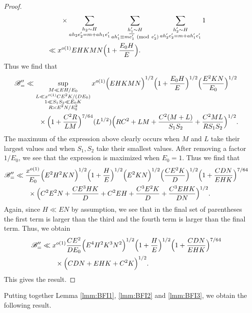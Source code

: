 \documentclass[10pt]{amsart}
\theoremstyle{plain}
\numberwithin{equation}{section}
\newcommand{\Mod}[1]{\ (\mathrm{mod}\ #1)}
\begin{document}
\begin{proof}
\begin{align*}
&\qquad\times\sum_{\substack{h_2\sim H\\ ah_2e_2'=m+ah_1e_1'}}\sum_{\substack{h_1'\sim H\\ a h_1'\equiv m\overline{e_1'}\Mod{e_2'}}}\sum_{\substack{h_2'\sim H\\ ah_2'e_2'=m+ah_1'e_1'}}1\\
&\ll x^{o(1)} E H K M N\Bigl(1+\frac{E_0 H}{E}\Bigr).
\end{align*}
Thus we find that
\begin{align*}
\mathscr{B}_{=}''&\ll \sup_{\substack{M\ll E H/E_0 \\ L\ll x^{o(1)}C E^2 K/(DE_0) \\ 1\ll S_1S_2\ll E_0 K\\ R\asymp E^2 N/E_0^2}}x^{o(1)} \Bigl(E H K M N\Bigr)^{1/2}\Bigl(1+\frac{E_0 H}{E}\Bigr)^{1/2}\Bigl(\frac{E^2 K N}{E_0}\Bigr)^{1/2} \\
&\qquad \times \Bigl(1+\frac{C^2 R }{L M}\Bigr)^{7/64}(L^{1/2})\Bigl(RC^2+L M+\frac{C^2(M+L)}{S_1S_2}+\frac{C^2 ML}{RS_1S_2}\Bigr)^{1/2}.
\end{align*}
The maximum of the expression above clearly occurs when $M$ and $L$ take their largest values and when $S_1,S_2$ take their smallest values. After removing a factor $1/E_0$, we see that the expression is maximized when $E_0=1$. Thus we find that
\begin{align*}
\mathscr{B}_{=}''&\ll \frac{x^{o(1)}}{E_0}\Bigl(E^2 H^2 K N\Bigr)^{1/2}\Bigl(1+\frac{H}{E}\Bigr)^{1/2}\Bigl(E^2 K N\Bigr)^{1/2} \Bigl(\frac{C E^2 K}{D}\Bigr)^{1/2}\Bigl(1+\frac{C D N}{E H K}\Bigr)^{7/64}\\
&\qquad \times \Bigl(C^2 E^2 N+ \frac{C E^3 H K}{D}+C^2 E H+\frac{C^3 E^2 K}{D}+\frac{C^3 E H K}{D N}\Bigr)^{1/2}.
\end{align*}
Again, since $H\ll EN$ by assumption, we see that in the final set of parentheses the first term is larger than the third and the fourth term is larger than the final term. Thus, we obtain
\begin{align*}
\mathscr{B}_{=}''&\ll x^{o(1)}\frac{C E^2 }{D E_0}\Bigl(E^4 H^2 K^3 N^2\Bigr)^{1/2}\Bigl(1+\frac{H}{E}\Bigr)^{1/2}\Bigl(1+\frac{C D N}{E H K}\Bigr)^{7/64}\\
&\qquad \times\Bigl(C D N+ E H K+C^2 K\Bigr)^{1/2}.
\end{align*}
This gives the result.
\end{proof}
%
%
%
%
%
%
%
%
Putting together Lemma \ref{lmm:BFI1}, \ref{lmm:BFI2} and \ref{lmm:BFI3}, we obtain the following result.
\end{document}
